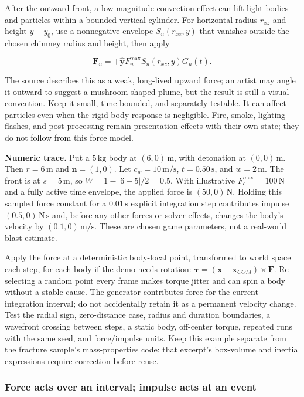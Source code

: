 After the outward front, a low-magnitude convection effect can lift light bodies and particles within a bounded vertical cylinder. For horizontal radius \(r_{xz}\) and height \(y-y_0\), use a nonnegative envelope \(S_u(r_{xz},y)\) that vanishes outside the chosen chimney radius and height, then apply

\[
\mathbf F_u=+\hat{\mathbf y}F_u^{\max}S_u(r_{xz},y)G_u(t).
\]

The source describes this as a weak, long-lived upward force; an artist may angle it outward to suggest a mushroom-shaped plume, but the result is still a visual convention. Keep it small, time-bounded, and separately testable. It can affect particles even when the rigid-body response is negligible. Fire, smoke, lighting flashes, and post-processing remain presentation effects with their own state; they do not follow from this force model.

\textbf{Numeric trace.} Put a \(5\,\mathrm{kg}\) body at \((6,0)\,\mathrm m\), with detonation at \((0,0)\,\mathrm m\). Then \(r=6\,\mathrm m\) and \(\mathbf n=(1,0)\). Let \(c_w=10\,\mathrm{m/s}\), \(t=0.50\,\mathrm s\), and \(w=2\,\mathrm m\). The front is at \(s=5\,\mathrm m\), so \(W=1-|6-5|/2=0.5\). With illustrative \(F_c^{\max}=100\,\mathrm N\) and a fully active time envelope, the applied force is \((50,0)\,\mathrm N\). Holding this sampled force constant for a \(0.01\,\mathrm s\) explicit integration step contributes impulse \((0.5,0)\,\mathrm{N\,s}\) and, before any other forces or solver effects, changes the body's velocity by \((0.1,0)\,\mathrm{m/s}\). These are chosen game parameters, not a real-world blast estimate.

Apply the force at a deterministic body-local point, transformed to world space each step, for each body if the demo needs rotation: \(\boldsymbol\tau=(\mathbf{x}-\mathbf{x}_{COM})\times\mathbf F\). Re-selecting a random point every frame makes torque jitter and can spin a body without a stable cause. The generator contributes force for the current integration interval; do not accidentally retain it as a permanent velocity change. Test the radial sign, zero-distance case, radius and duration boundaries, a wavefront crossing between steps, a static body, off-center torque, repeated runs with the same seed, and force/impulse units. Keep this example separate from the fracture sample's mass-properties code: that excerpt's box-volume and inertia expressions require correction before reuse.

\subsubsection{Force acts over an interval; impulse acts at an event}\label{force-acts-over-an-interval-impulse-acts-at-an-event}


